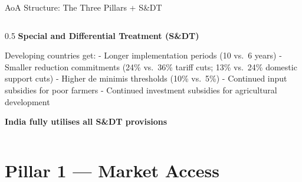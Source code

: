 \documentclass[
  ignorenonframetext,
  aspectratio=169,
]{beamer}
\makeatletter
\let\quarto@originallabel\label
\DeclareRobustCommand*{\label}[1]{\quarto@originallabel{#1}}
\makeatother
\begin{document}
\begin{frame}{AoA Structure: The Three Pillars + S\&DT}
\begin{columns}[T]
\begin{column}{0.5\linewidth}
\textbf{Special and Differential Treatment (S\&DT)}

Developing countries get: - Longer implementation periods (10 vs.~6
years) - Smaller reduction commitments (24\% vs.~36\% tariff cuts; 13\%
vs.~24\% domestic support cuts) - Higher de minimis thresholds (10\%
vs.~5\%) - Continued input subsidies for poor farmers - Continued
investment subsidies for agricultural development

\textbf{India fully utilises all S\&DT provisions}
\end{column}
\end{columns}
\end{frame}

\begin{frame}
\end{frame}

\section{Pillar 1 --- Market Access}\label{pillar-1-market-access}
\end{document}
